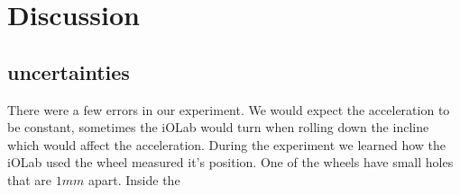 \documentclass[main.tex]{subfiles}
\begin{document}
\section{Discussion}
\subsection{uncertainties}
There were a few errors in our experiment. We would expect the acceleration to be constant, sometimes the iOLab would turn when rolling down the incline which would affect the acceleration. During the experiment we learned how the iOLab used the wheel measured it's position. One of the wheels have small holes that are $1mm$ apart. Inside the 
\end{document}

